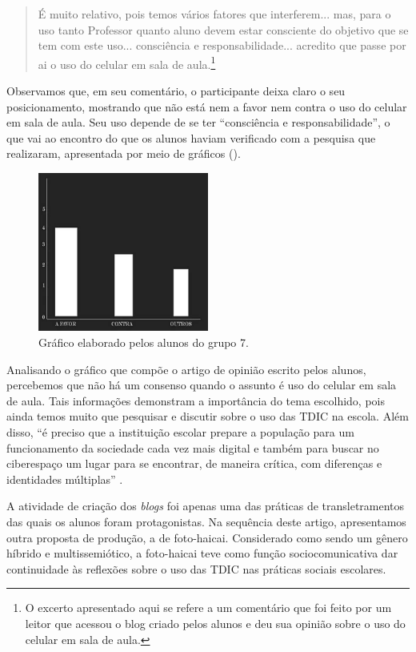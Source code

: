 \documentclass{textolivre}
\begin{document}
\begin{quote}
É muito relativo, pois temos vários fatores que interferem... mas, para o uso tanto Professor quanto aluno devem estar consciente do objetivo que se tem com este uso... consciência e responsabilidade... acredito que passe por ai o uso do celular em sala de aula.\footnote{O excerto apresentado aqui se refere a um comentário que foi feito por um leitor que acessou o blog criado pelos alunos e deu sua opinião sobre o uso do celular em sala de aula.}
\end{quote}

Observamos que, em seu comentário, o participante deixa claro o seu posicionamento, mostrando que não está nem a favor nem contra o uso do celular em sala de aula. Seu uso depende de se ter “consciência e responsabilidade”, o que vai ao encontro do que os alunos haviam verificado com a pesquisa que realizaram, apresentada por meio de gráficos ().

\begin{figure}[h]
    \centering
    \includegraphics[width=0.5\textwidth]{figure05.png}
    \caption{Gráfico elaborado pelos alunos do grupo 7.}
    \label{fig05}
\end{figure}

Analisando o gráfico que compõe o artigo de opinião escrito pelos alunos, percebemos que não há um consenso quando o assunto é uso do celular em sala de aula. Tais informações demonstram a importância do tema escolhido, pois ainda temos muito que pesquisar e discutir sobre o uso das TDIC na escola. Além disso, “é preciso que a instituição escolar prepare a população para um funcionamento da sociedade cada vez mais digital e também para buscar no ciberespaço um lugar para se encontrar, de maneira crítica, com diferenças e identidades múltiplas” \cite[p.~7]{rojo2013}.

A atividade de criação dos \emph{blogs} foi apenas uma das práticas de transletramentos das quais os alunos foram protagonistas. Na sequência deste artigo, apresentamos outra proposta de produção, a de foto-haicai. Considerado como sendo um gênero híbrido e multissemiótico, a foto-haicai teve como função sociocomunicativa dar continuidade às reflexões sobre o uso das TDIC nas práticas sociais escolares.
\end{document}
